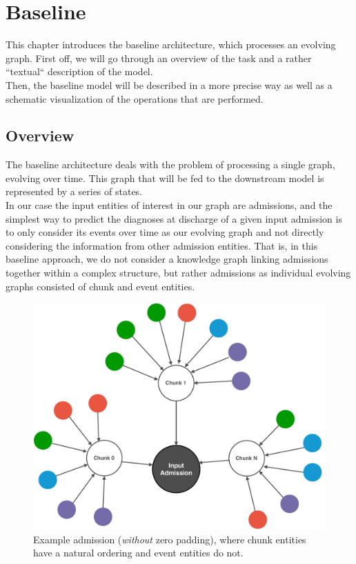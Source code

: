 \chapter{Baseline}
\label{chap:Baseline}
This chapter introduces the baseline architecture, which processes an evolving graph. First off, we will go through an overview of the task and a rather ``textual`` description of the model. \\

Then, the baseline model will be described in a more precise way as well as a schematic visualization of the operations that are performed.

\section{Overview}
The baseline architecture deals with the problem of processing a single graph, evolving over time. This graph that will be fed to the downstream model is represented by a series of states.\\

In our case the input entities of interest in our graph are admissions, and the simplest way to predict the diagnoses at discharge of a given input admission is to only consider its events over time as our evolving graph and not directly considering the information from other admission entities. That is, in this baseline approach, we do not consider a knowledge graph linking admissions together within a complex structure, but rather admissions as individual evolving graphs consisted of chunk and event entities. \\

\begin{figure}
 \centering
 \includegraphics[width=.8\linewidth]{figures/single-adm-graph.pdf}
 \captionsetup{width=.8\linewidth}
 \caption{Example admission (\textit{without} zero padding), where chunk entities have a natural ordering and event entities do not.}
 \label{fig:single-adm-graph}
\end{figure}

